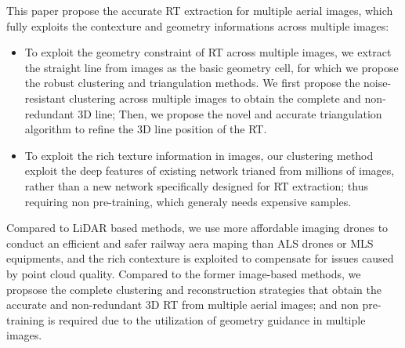This paper propose the accurate RT extraction for multiple aerial images,
which fully exploits the contexture and geometry informations across multiple images:
\vspace{-0.5em}
\begin{itemize}
    \item To exploit the geometry constraint of RT across multiple images, 
    we extract the straight line from images as the basic geometry cell, 
    for which we propose the robust clustering and triangulation methods.
    We first propose the noise-resistant clustering across multiple images to obtain the complete and non-redundant 3D line;
    Then, we propose the novel and accurate triangulation algorithm to refine the 3D line position of the RT.  
    \vspace{-0.5em}
    \item To exploit the rich texture information in images,
    our clustering method exploit the deep features of existing network trianed from millions of images, 
    rather than a new network specifically designed for RT extraction;
    thus requiring non pre-training, which generaly needs expensive samples.
\end{itemize}
\vspace{-0.5em}
Compared to LiDAR based methods,
we use more affordable imaging drones to conduct an efficient and safer railway aera maping than ALS drones or MLS equipments,
and the rich contexture is exploited to compensate for issues caused by point cloud quality.
Compared to the former image-based methods,
we propsose the complete clustering and reconstruction strategies that obtain the accurate and non-redundant 3D RT from multiple aerial images;
and non pre-training is required due to the utilization of geometry guidance in multiple images.





























